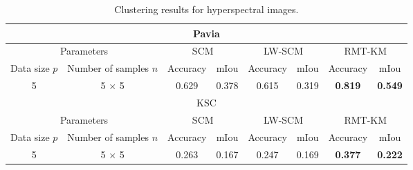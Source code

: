\begin{table*}
\begin{tabular}{|c | c || c | c||c | c||c | c||}
\hline
\multicolumn{8}{|c|}{Pavia} \\
\hline
\multicolumn{2}{|c|}{Parameters} & \multicolumn{2}{|c||}{SCM} & \multicolumn{2}{|c||}{LW-SCM} & \multicolumn{2}{|c|}{RMT-KM} \\ [0.5ex] 
\hline
Data size $p$ & Number of samples $n$ & Accuracy & mIou & Accuracy & mIou & Accuracy & mIou \\ [0.5ex] 
\hline\hline
5 & 5 $\times$ 5 & 0.629 & 0.378 & 0.615 & 0.319 & {\bf 0.819} & {\bf 0.549} \\ 
\hline
\multicolumn{8}{|c|}{KSC} \\
\hline
\multicolumn{2}{|c|}{Parameters} & \multicolumn{2}{|c||}{SCM} & \multicolumn{2}{|c||}{LW-SCM} & \multicolumn{2}{|c|}{RMT-KM} \\ [0.5ex] 
\hline
Data size $p$ & Number of samples $n$ & Accuracy & mIou & Accuracy & mIou & Accuracy & mIou \\ [0.5ex] 
\hline\hline
5 & 5 $\times$ 5 & 0.263 & 0.167 & 0.247 & 0.169 & {\bf 0.377} & {\bf 0.222} \\ 
\hline
\end{tabular}
\caption{Clustering results for hyperspectral images.}
\end{table*}